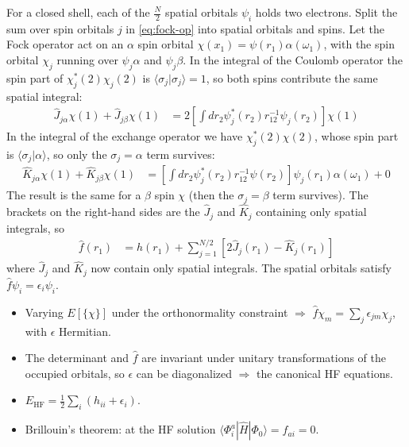 For a closed shell, each of the $\frac{N}{2}$ spatial orbitals $\psi_i$ holds two electrons. Split the sum over spin orbitals $j$ in \eqref{eq:fock-op} into spatial orbitals and spins. Let the Fock operator act on an $\alpha$ spin orbital $\chi(x_1) = \psi(r_1) \alpha(\omega_1)$, with the spin orbital $\chi_j$ running over $\psi_j \alpha$ and $\psi_j \beta$. In the integral of the Coulomb operator the spin part of $\chi_j^*(2) \chi_j(2)$ is $\langle \sigma_j|\sigma_j\rangle = 1$, so both spins contribute the same spatial integral:
\begin{align*}
\hat{J}_{j \alpha} \chi(1) + \hat{J}_{j \beta} \chi(1) &= 2 \left[ \int dr_2 \psi_j^*(r_2) r_{12}^{-1} \psi_j(r_2) \right] \chi(1)
\end{align*}
In the integral of the exchange operator we have $\chi_j^*(2) \chi(2)$, whose spin part is $\langle \sigma_j|\alpha\rangle$, so only the $\sigma_j = \alpha$ term survives:
\begin{align*}
\hat{K}_{j \alpha} \chi(1) + \hat{K}_{j \beta} \chi(1) &= \left[ \int dr_2 \psi_j^*(r_2) r_{12}^{-1} \psi(r_2) \right] \psi_j(r_1) \alpha(\omega_1) + 0
\end{align*}
The result is the same for a $\beta$ spin $\chi$ (then the $\sigma_j = \beta$ term survives). The brackets on the right-hand sides are the $\hat{J}_j$ and $\hat{K}_j$ containing only spatial integrals, so
\begin{align}\label{eq:fock-rhf}
\hat{f}(r_1) &= h(r_1) + \sum_{j=1}^{N/2} [2 \hat{J}_j(r_1) - \hat{K}_j(r_1)]
\end{align}
where $\hat{J}_j$ and $\hat{K}_j$ now contain only spatial integrals. The spatial orbitals satisfy $\hat{f} \psi_i = \epsilon_i \psi_i$.

\begin{summary}
\begin{itemize}
\item Varying $E[\{\chi\}]$ under the orthonormality constraint $\Rightarrow$ $\hat{f} \chi_m = \sum_j \epsilon_{jm} \chi_j$, with $\epsilon$ Hermitian.
\item The determinant and $\hat{f}$ are invariant under unitary transformations of the occupied orbitals, so $\epsilon$ can be diagonalized $\Rightarrow$ the canonical HF equations.
\item $E_{\text{HF}} = \frac{1}{2} \sum_i (h_{ii} + \epsilon_i)$.
\item Brillouin's theorem: at the HF solution $\langle \Phi_i^a | \hat{H} | \Phi_0 \rangle = f_{ai} = 0$.
\end{itemize}
\end{summary}

